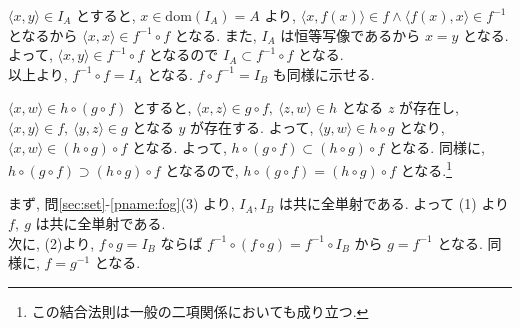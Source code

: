 \begin{nmprob}
{$\langle x, y\rangle \in I_A$ とすると, $x \in \text{dom}(I_A) = A$ より, $\langle x, f(x)\rangle \in f \land \langle f(x), x\rangle \in f^{-1}$ となるから $\langle x, x\rangle \in f^{-1}\circ f$ となる.
また, $I_A$ は恒等写像であるから $x = y$ となる. よって, $\langle x, y\rangle \in f^{-1}\circ f$ となるので $I_A \subset f^{-1}\circ f$ となる.\\
以上より, $f^{-1}\circ f = I_A$ となる. $f\circ f^{-1} = I_B$ も同様に示せる.
\item
$\langle x, w\rangle \in h\circ (g\circ f)$ とすると, $\langle x, z\rangle \in g \circ f,\ \langle z, w\rangle \in h$ となる $z$ が存在し,
$\langle x, y\rangle \in f,\ \langle y, z\rangle \in g$ となる $y$ が存在する. よって, $\langle y, w\rangle \in h\circ g$ となり,
$\langle x, w\rangle \in (h \circ g) \circ f$ となる. よって, $h \circ (g \circ f) \subset (h \circ g)\circ f$ となる.
同様に, $h \circ (g \circ f) \supset (h \circ g)\circ f$ となるので, $h \circ (g \circ f) = (h \circ g)\circ f$ となる.\footnote[1]{この結合法則は一般の二項関係においても成り立つ.}
\item まず, 問\ref{sec:set}-\ref{pname:fog}(3) より, $I_A, I_B$ は共に全単射である. よって (1) より $f,\ g$ は共に全単射である.\\
次に, (2)より, $f\circ g = I_B$ ならば $f^{-1}\circ (f\circ g) = f^{-1}\circ I_B$ から $g = f^{-1}$ となる. 同様に, $f = g^{-1}$ となる.
}
\end{nmprob}

